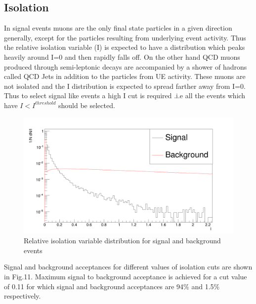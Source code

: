 \documentclass[12pt,a4paper]{article}		%
\begin{document}
\subsection{Isolation}

In signal events muons are the only final state particles in a given direction generally, except for the particles resulting from underlying event activity. Thus the relative isolation variable (I) is expected to have a distribution which peaks heavily around I=0 and then rapidly falls off. On the other hand QCD muons produced through semi-leptonic decays are accompanied by a shower of hadrons called QCD Jets in addition to the particles from UE activity. These muons are not isolated and the I distribution is expected to spread farther away from I=0. Thus to select signal like events a high I cut is required .i.e all the events which have $I<I^{threshold }$ should be selected.        

\begin{figure}[h]
	\begin{center}
		\includegraphics[scale=0.2]{Isvsbg.png} 
		\caption{Relative isolation variable distribution for signal and background events} 		
	\end{center}
	\centering	
\end{figure}
			
Signal and background acceptances for different values of isolation cuts are shown in Fig.11. Maximum signal to background acceptance is achieved for a cut value of 0.11 for which signal and background acceptances are 94$\%$ and 1.5$\%$ respectively.	 	
\end{document}

